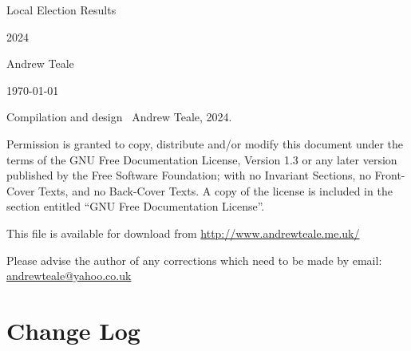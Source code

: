\documentclass[a4paper,openany]{book}
\begin{document}

\begin{titlepage}

\begin{center}

\Huge Local Election Results

2024

\bigskip

\Large Andrew Teale

\vfill

\newcommand\versionno{0.10.1}


\today

\end{center}

\end{titlepage}


\begin{center}

%

\bigskip

Compilation and design \textcopyright\ Andrew Teale, 2024.

 Permission is granted to copy, distribute and/or modify this document
 under the terms of the GNU Free Documentation License, Version 1.3
 or any later version published by the Free Software Foundation;
 with no Invariant Sections, no Front-Cover Texts, and no Back-Cover Texts.
 A copy of the license is included in the section entitled ``GNU
 Free Documentation License''.

\bigskip

This file is available for download from
\url{http://www.andrewteale.me.uk/}

\bigskip

Please advise the author of any corrections which need to be made by
email: \url{andrewteale@yahoo.co.uk}

\vfill
\end{center}

\section*{Change Log}


%
\end{document}
